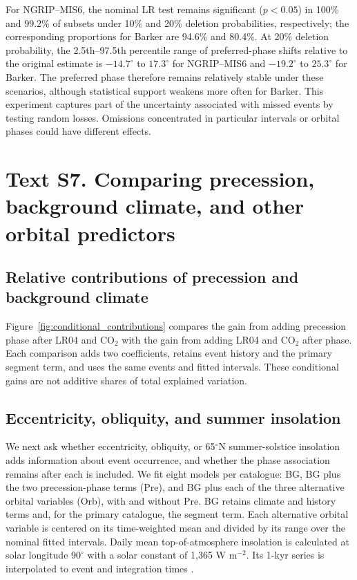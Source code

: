 \documentclass[11pt]{article}
\begin{document}
For NGRIP--MIS6, the nominal LR test remains significant ($p<0.05$) in 100\% and 99.2\% of subsets under 10\% and 20\% deletion probabilities, respectively; the corresponding proportions for Barker are 94.6\% and 80.4\%. At 20\% deletion probability, the 2.5th--97.5th percentile range of preferred-phase shifts relative to the original estimate is $-14.7^\circ$ to $17.3^\circ$ for NGRIP--MIS6 and $-19.2^\circ$ to $25.3^\circ$ for Barker. The preferred phase therefore remains relatively stable under these scenarios, although statistical support weakens more often for Barker. This experiment captures part of the uncertainty associated with missed events by testing random losses. Omissions concentrated in particular intervals or orbital phases could have different effects.

\section*{Text S7. Comparing precession, background climate, and other orbital predictors}

\subsection*{Relative contributions of precession and background climate}

Figure~\ref{fig:conditional_contributions} compares the gain from adding precession phase after LR04 and CO$_2$ with the gain from adding LR04 and CO$_2$ after phase. Each comparison adds two coefficients, retains event history and the primary segment term, and uses the same events and fitted intervals. These conditional gains are not additive shares of total explained variation.

\subsection*{Eccentricity, obliquity, and summer insolation}

We next ask whether eccentricity, obliquity, or 65$^\circ$N summer-solstice insolation adds information about event occurrence, and whether the phase association remains after each is included. We fit eight models per catalogue: BG, BG plus the two precession-phase terms (Pre), and BG plus each of the three alternative orbital variables (Orb), with and without Pre. BG retains climate and history terms and, for the primary catalogue, the segment term. Each alternative orbital variable is centered on its time-weighted mean and divided by its range over the nominal fitted intervals. Daily mean top-of-atmosphere insolation is calculated at solar longitude $90^\circ$ with a solar constant of 1,365 W m$^{-2}$. Its 1-kyr series is interpolated to event and integration times \citep{laskar2004long}.
\end{document}

